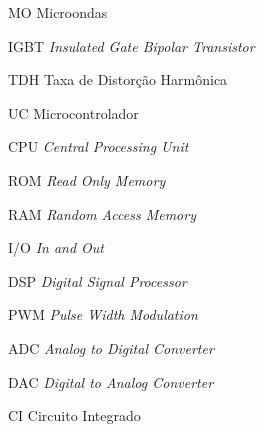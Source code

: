 
\begin{siglas}
    \item[MO] Microondas
    \item[IGBT] \textit{Insulated Gate Bipolar Transistor}
    \item[TDH] Taxa de Distorção Harmônica
    \item[UC] Microcontrolador
    \item[CPU] \textit{Central Processing Unit}
    \item[ROM] \textit{Read Only Memory}
    \item[RAM] \textit{Random Access Memory}
    \item[I/O] \textit{In and Out}
    \item[DSP] \textit{Digital Signal Processor}
    \item[PWM] \textit{Pulse Width Modulation}
    \item[ADC] \textit{Analog to Digital Converter}
    \item[DAC] \textit{Digital to Analog Converter}
    \item[CI] Circuito Integrado
\end{siglas}


